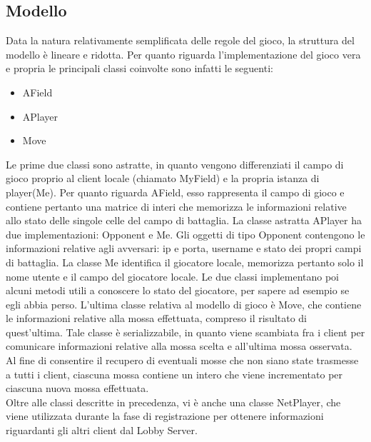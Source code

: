 \subsection{Modello}
Data la natura relativamente semplificata delle regole del gioco, la struttura 
del modello è lineare e ridotta. Per quanto riguarda l'implementazione del 
gioco vera e propria le principali classi coinvolte sono infatti le seguenti:
\begin{itemize}
 \item AField
 \item APlayer
 \item Move
\end{itemize}
Le prime due classi sono astratte, in quanto vengono differenziati il campo di 
gioco proprio al client locale (chiamato MyField) e la propria istanza di 
player(Me). Per quanto riguarda AField, esso rappresenta il campo di gioco e 
contiene pertanto una matrice di interi che memorizza le informazioni 
relative allo stato delle singole celle del campo di battaglia.
La classe astratta APlayer ha due implementazioni: Opponent e Me. Gli 
oggetti di tipo Opponent contengono le informazioni relative agli avversari: ip 
e porta, username e stato dei propri campi di battaglia. La classe Me 
identifica il giocatore locale, memorizza pertanto solo il nome utente e il 
campo del giocatore locale. Le due classi implementano poi alcuni metodi utili 
a conoscere lo stato del giocatore, per sapere ad esempio se egli abbia perso.
L'ultima classe relativa al modello di gioco è Move, che contiene le 
informazioni relative alla mossa effettuata, compreso il risultato di 
quest'ultima. Tale classe è serializzabile, in quanto viene scambiata fra i 
client per comunicare informazioni relative alla mossa scelta e all'ultima 
mossa osservata. Al fine di consentire il recupero di eventuali mosse che non 
siano state trasmesse a tutti i client, ciascuna mossa contiene un intero che 
viene incrementato per ciascuna nuova mossa effettuata.
\\
Oltre alle classi descritte in precedenza, vi è anche una classe NetPlayer, che 
viene utilizzata durante la fase di registrazione per ottenere informazioni 
riguardanti gli altri client dal Lobby Server.